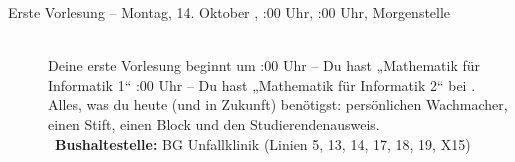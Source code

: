 \begin{description}
\ifbachelor
	\item[Erste Vorlesung -- Montag, 14. Oktober \YEAR, \ifwintersemester 8:00 Uhr, \else 10:00 Uhr, \fi Morgenstelle]~\\
	Deine erste Vorlesung beginnt um
	:00 Uhr -- Du hast „Mathematik für Informatik 1“  \fi
	:00 Uhr -- Du hast „Mathematik für Informatik 2“  \fi
	bei \Matheprof.
	Alles, was du heute (und in Zukunft) benötigst: persönlichen Wachmacher, einen Stift, einen Block und den Studierendenausweis.\\
	~\textbf{Bushaltestelle:} BG Unfallklinik (Linien 5, 13, 14, 17, 18, 19, X15)
\fi



\end{description}
